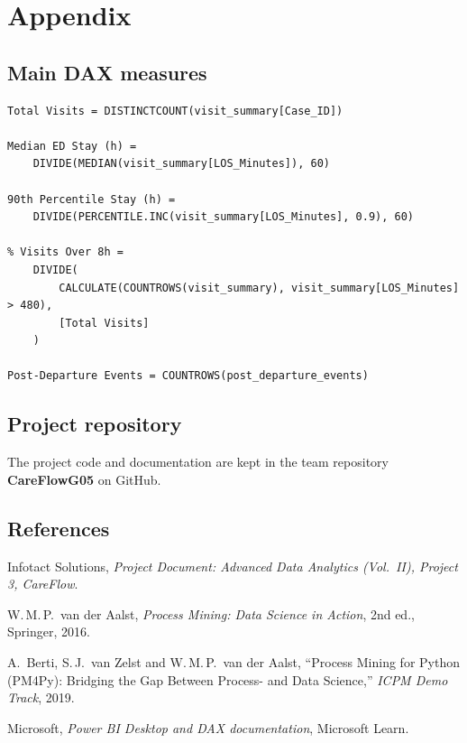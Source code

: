 \documentclass[11pt,a4paper]{article}
\begin{document}
\appendix
\section{Appendix}
\subsection{Main DAX measures}
\begin{lstlisting}[style=dax]
Total Visits = DISTINCTCOUNT(visit_summary[Case_ID])

Median ED Stay (h) =
    DIVIDE(MEDIAN(visit_summary[LOS_Minutes]), 60)

90th Percentile Stay (h) =
    DIVIDE(PERCENTILE.INC(visit_summary[LOS_Minutes], 0.9), 60)

% Visits Over 8h =
    DIVIDE(
        CALCULATE(COUNTROWS(visit_summary), visit_summary[LOS_Minutes] > 480),
        [Total Visits]
    )

Post-Departure Events = COUNTROWS(post_departure_events)
\end{lstlisting}

\subsection{Project repository}
The project code and documentation are kept in the team repository \textbf{CareFlowG05} on GitHub.

\subsection{References}
\begin{enumerate}[label=\textcolor{teal}{[\arabic*]}]
  \item Infotact Solutions, \emph{Project Document: Advanced Data Analytics (Vol.\ II), Project 3, CareFlow}.
  \item W.\,M.\,P.\ van der Aalst, \emph{Process Mining: Data Science in Action}, 2nd ed., Springer, 2016.
  \item A.\ Berti, S.\,J.\ van Zelst and W.\,M.\,P.\ van der Aalst, ``Process Mining for Python (PM4Py): Bridging the Gap Between Process- and Data Science,'' \emph{ICPM Demo Track}, 2019.
  \item Microsoft, \emph{Power BI Desktop and DAX documentation}, Microsoft Learn.
\end{enumerate}
\end{document}
